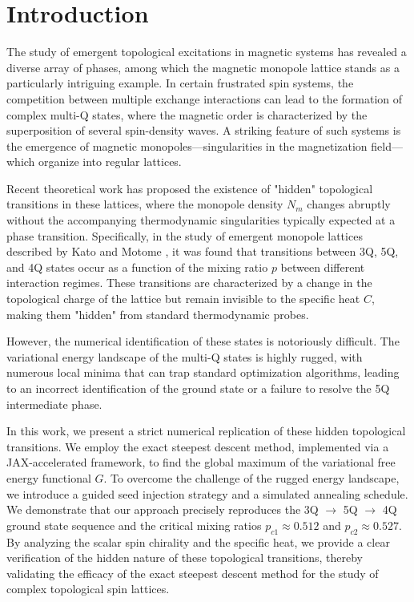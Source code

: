 \section{Introduction}
\label{sec:intro}

The study of emergent topological excitations in magnetic systems has revealed a diverse array of phases, among which the magnetic monopole lattice stands as a particularly intriguing example. In certain frustrated spin systems, the competition between multiple exchange interactions can lead to the formation of complex multi-Q states, where the magnetic order is characterized by the superposition of several spin-density waves. A striking feature of such systems is the emergence of magnetic monopoles—singularities in the magnetization field—which organize into regular lattices.

Recent theoretical work has proposed the existence of "hidden" topological transitions in these lattices, where the monopole density $N_m$ changes abruptly without the accompanying thermodynamic singularities typically expected at a phase transition. Specifically, in the study of emergent monopole lattices described by Kato and Motome \cite{Kato2023}, it was found that transitions between 3Q, 5Q, and 4Q states occur as a function of the mixing ratio $p$ between different interaction regimes. These transitions are characterized by a change in the topological charge of the lattice but remain invisible to the specific heat $C$, making them "hidden" from standard thermodynamic probes.

However, the numerical identification of these states is notoriously difficult. The variational energy landscape of the multi-Q states is highly rugged, with numerous local minima that can trap standard optimization algorithms, leading to an incorrect identification of the ground state or a failure to resolve the 5Q intermediate phase.

In this work, we present a strict numerical replication of these hidden topological transitions. We employ the exact steepest descent method, implemented via a JAX-accelerated framework, to find the global maximum of the variational free energy functional $G$. To overcome the challenge of the rugged energy landscape, we introduce a guided seed injection strategy and a simulated annealing schedule. We demonstrate that our approach precisely reproduces the 3Q $\to$ 5Q $\to$ 4Q ground state sequence and the critical mixing ratios $p_{c1} \approx 0.512$ and $p_{c2} \approx 0.527$. By analyzing the scalar spin chirality and the specific heat, we provide a clear verification of the hidden nature of these topological transitions, thereby validating the efficacy of the exact steepest descent method for the study of complex topological spin lattices.
